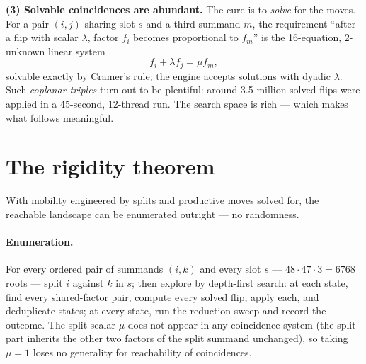\documentclass[10pt]{article}
\begin{document}
\textbf{(3) Solvable coincidences are abundant.} The cure is to
\emph{solve} for the moves. For a pair $(i,j)$ sharing slot $s$ and a
third summand $m$, the requirement ``after a flip with scalar
$\lambda$, factor $f_i$ becomes proportional to $f_m$'' is the
16-equation, 2-unknown linear system
\[
  f_i+\lambda f_j=\mu f_m,
\]
solvable exactly by Cramer's rule; the engine accepts solutions with
dyadic $\lambda$. Such \emph{coplanar triples} turn out to be
plentiful: around 3.5 million solved flips were applied in a
45-second, 12-thread run. The search space is rich --- which makes
what follows meaningful.

\section{The rigidity theorem}\label{sec:theorem}

With mobility engineered by splits and productive moves solved for,
the reachable landscape can be enumerated outright --- no randomness.

\paragraph{Enumeration.}
For every ordered pair of summands $(i,k)$ and every slot $s$ ---
$48\cdot47\cdot3=6768$ roots --- split $i$ against $k$ in $s$; then
explore by depth-first search: at each state, find every
shared-factor pair, compute every solved flip, apply each, and
deduplicate states; at every state, run the reduction sweep and
record the outcome. The split scalar $\mu$ does not appear in any
coincidence system (the split part inherits the other two factors of
the split summand unchanged), so taking $\mu=1$ loses no generality
for reachability of coincidences.
\end{document}
